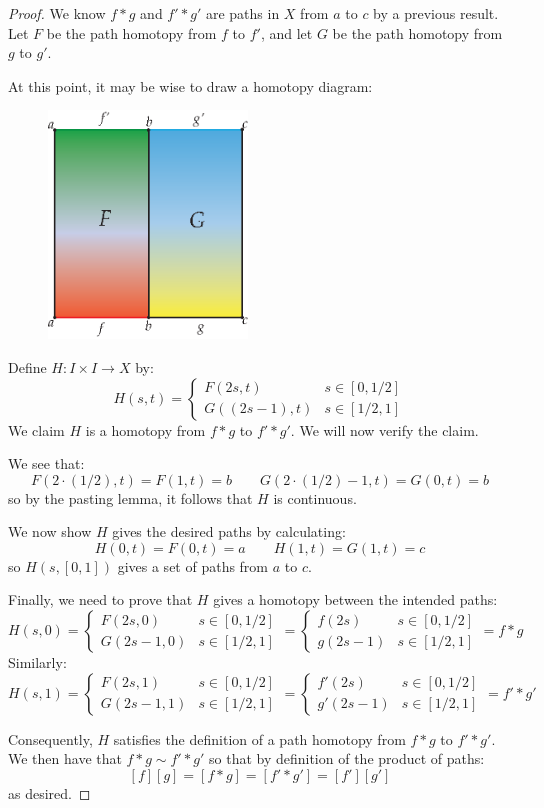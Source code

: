 \begin{proof}
	We know $f*g$ and $f'*g'$ are paths in $X$ from $a$ to $c$ by a previous result. Let $F$ be the path homotopy from $f$ to $f'$, and let $G$ be the path homotopy from $g$ to $g'$.
	
	At this point, it may be wise to draw a homotopy diagram: 
    \begin{figure}[ht!]
        \centering
        \includegraphics[width=150pt]{images/homotopy/product_well_defined}
    \end{figure}
	
	Define $H:I\times I\to X$ by:
	\[H(s,t) = 
	\begin{cases}
		F(2s,t) & s\in [0,1/2] \\
		G((2s-1),t) & s\in [1/2,1] 
	\end{cases}
	\]
	We claim $H$ is a homotopy from $f*g$ to $f'*g'$. We will now verify the claim. 
	
	We see that:
	\[F(2\cdot(1/2),t) = F(1,t) = b \qquad G(2\cdot(1/2) -1,t) = G(0,t) = b\]
	so by the pasting lemma, it follows that $H$ is continuous.
	
	We now show $H$ gives the desired paths by calculating:
	\[H(0,t) = F(0,t) = a \qquad H(1,t) = G(1,t) = c\]
	so $H(s,[0,1])$ gives a set of paths from $a$ to $c$. 
	
	Finally, we need to prove that $H$ gives a homotopy between the intended paths:
	\[H(s,0) = 
	\begin{cases}
		F(2s,0) & s\in [0,1/2] \\
		G(2s-1,0) & s\in [1/2,1] 
	\end{cases}
	= 
	\begin{cases}
		f(2s) & s\in [0,1/2] \\
		g(2s-1) & s\in [1/2,1] 
	\end{cases}
	= f*g \]
	Similarly:
	\[H(s,1) = 
	\begin{cases}
		F(2s,1) & s\in [0,1/2] \\
		G(2s-1,1) & s\in [1/2,1] 
	\end{cases}
	= 
	\begin{cases}
		f'(2s) & s\in [0,1/2] \\
		g'(2s-1) & s\in [1/2,1] 
	\end{cases}
	= f'*g' \]
	
	Consequently, $H$ satisfies the definition of a path homotopy from $f*g$ to $f'*g'$. We then have that $f*g\sim f'*g'$ so that by definition of the product of paths:
	\[[f][g] = [f*g] = [f'*g'] = [f'][g']\]
	as desired. 
\end{proof}
